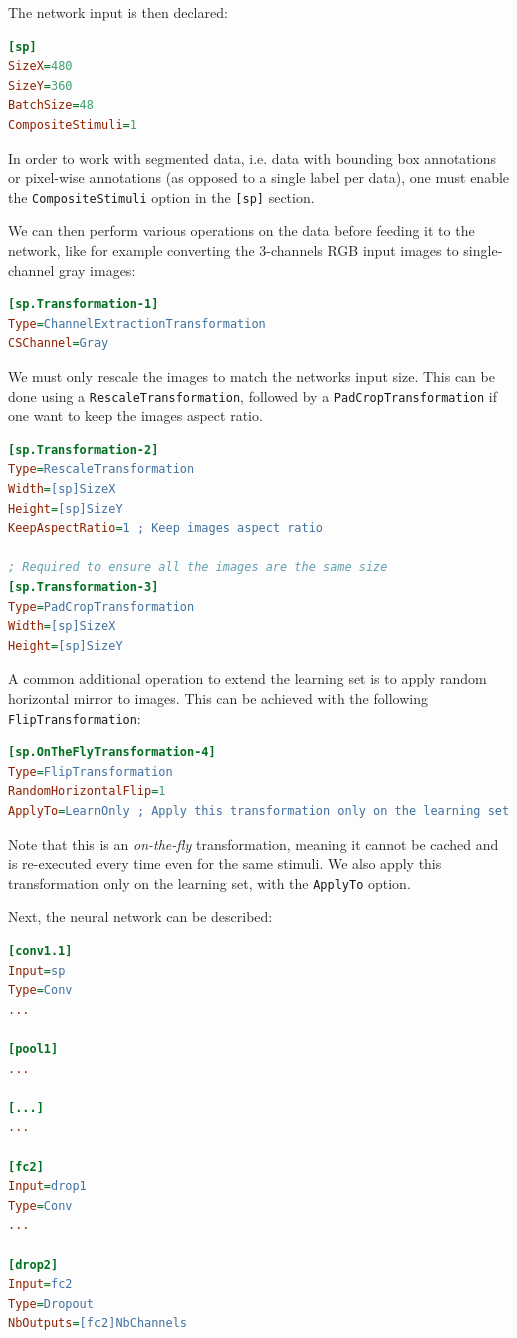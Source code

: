 \documentclass[a4paper,11pt,oneside]{article}
\begin{document}
The network input is then declared:
\begin{lstlisting}[language=ini]
[sp]
SizeX=480
SizeY=360
BatchSize=48
CompositeStimuli=1
\end{lstlisting}

In order to work with segmented data, i.e. data with bounding box annotations or
pixel-wise annotations (as opposed to a single label per data), one must enable
the \lstinline!CompositeStimuli! option in the \lstinline![sp]! section.

We can then perform various operations on the data before feeding it to the
network, like for example converting the 3-channels RGB input images to
single-channel gray images:

\begin{lstlisting}[language=ini]
[sp.Transformation-1]
Type=ChannelExtractionTransformation
CSChannel=Gray
\end{lstlisting}

We must only rescale the images to match the networks input size. This can be
done using a \lstinline!RescaleTransformation!, followed by a
\lstinline!PadCropTransformation! if one want to keep the images aspect ratio.

\begin{lstlisting}[language=ini]
[sp.Transformation-2]
Type=RescaleTransformation
Width=[sp]SizeX
Height=[sp]SizeY
KeepAspectRatio=1 ; Keep images aspect ratio

; Required to ensure all the images are the same size
[sp.Transformation-3]
Type=PadCropTransformation
Width=[sp]SizeX
Height=[sp]SizeY
\end{lstlisting}

A common additional operation to extend the learning set is to apply random
horizontal mirror to images. This can be achieved with the following
\lstinline!FlipTransformation!:

\begin{lstlisting}[language=ini]
[sp.OnTheFlyTransformation-4]
Type=FlipTransformation
RandomHorizontalFlip=1
ApplyTo=LearnOnly ; Apply this transformation only on the learning set
\end{lstlisting}

Note that this is an \emph{on-the-fly} transformation, meaning it cannot be
cached and is re-executed every time even for the same stimuli.
We also apply this transformation only on the learning set, with the
\lstinline!ApplyTo! option.

Next, the neural network can be described:
\begin{lstlisting}[language=ini]
[conv1.1]
Input=sp
Type=Conv
...

[pool1]
...

[...]
...

[fc2]
Input=drop1
Type=Conv
...

[drop2]
Input=fc2
Type=Dropout
NbOutputs=[fc2]NbChannels
\end{lstlisting}
\end{document}

